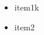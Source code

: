 \documentclass[a4paper, 11pt]{article}
\begin{document}
\ifx
\begin{itemize}
		\item item1k
		\item item2
	\end{itemize}
\fi



\end{document}
